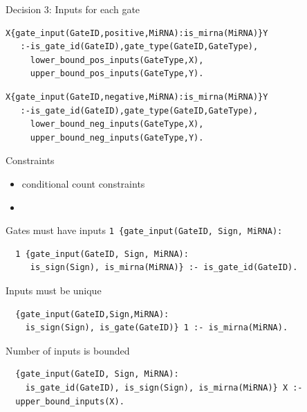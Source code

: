 \documentclass[10pt,dvipsnames]{beamer}
\begin{document}
\begin{frame}[fragile]{Decision 3: Inputs for each gate}
\small
{\color{blue}{\large positive inputs:}}
\begin{verbatim}
X{gate_input(GateID,positive,MiRNA):is_mirna(MiRNA)}Y 
   :-is_gate_id(GateID),gate_type(GateID,GateType),
     lower_bound_pos_inputs(GateType,X), 
     upper_bound_pos_inputs(GateType,Y).
\end{verbatim}

{\color{blue}{\large negative inputs:}}
\begin{verbatim}
X{gate_input(GateID,negative,MiRNA):is_mirna(MiRNA)}Y 
   :-is_gate_id(GateID),gate_type(GateID,GateType),
     lower_bound_neg_inputs(GateType,X),
     upper_bound_neg_inputs(GateType,Y).
\end{verbatim}
\end{frame}



\begin{frame}[fragile]{Constraints}
 \begin{itemize}
  \item conditional count constraints
  \item
 \end{itemize}

\end{frame}


\begin{frame}[fragile]{Gates must have inputs}
 \texttt{1 \{gate\_input(GateID, Sign, MiRNA):}
 \begin{verbatim}
  1 {gate_input(GateID, Sign, MiRNA):
     is_sign(Sign), is_mirna(MiRNA)} :- is_gate_id(GateID).
 \end{verbatim}
\end{frame}


\begin{frame}[fragile]{Inputs must be unique}
 \begin{verbatim}
  {gate_input(GateID,Sign,MiRNA):
    is_sign(Sign), is_gate(GateID)} 1 :- is_mirna(MiRNA).
 \end{verbatim}
\end{frame}


\begin{frame}[fragile]{Number of inputs is bounded}
 \begin{verbatim}
  {gate_input(GateID, Sign, MiRNA):
    is_gate_id(GateID), is_sign(Sign), is_mirna(MiRNA)} X :-
  upper_bound_inputs(X).
 \end{verbatim}
\end{frame}
\end{document}
